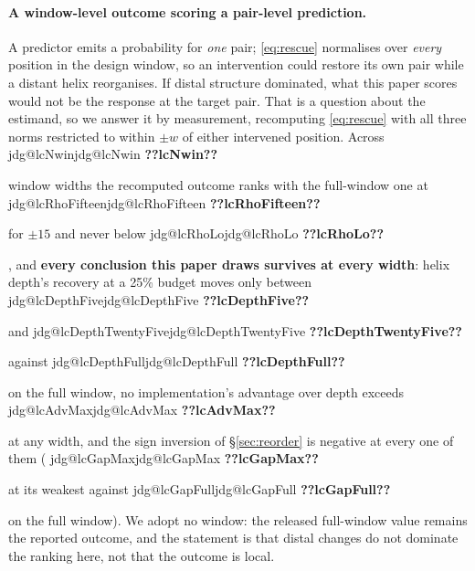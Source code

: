 \documentclass[11pt]{article}
\makeatletter
\newcommand{\jdg}[1]{%
  \ifcsname jdg@#1\endcsname\csname jdg@#1\endcsname
  \else\textbf{??#1??}\PackageError{nm}{undefined measured quantity #1}{}\fi}
\makeatother
\begin{document}
\paragraph{A window-level outcome scoring a pair-level prediction.} A predictor emits a probability
for \emph{one} pair; \eqref{eq:rescue} normalises over \emph{every} position in the design window,
so an intervention could restore its own pair while a distant helix reorganises. If distal
structure dominated, what this paper scores would not be the response at the target pair. That is a
question about the estimand, so we answer it by measurement, recomputing \eqref{eq:rescue} with all
three norms restricted to within $\pm w$ of either intervened position.
Across \jdg{lcNwin} window widths the recomputed outcome ranks with the full-window one at
\jdg{lcRhoFifteen} for $\pm15$ and never below \jdg{lcRhoLo}, and \textbf{every conclusion this
paper draws survives at every width}: helix depth's recovery at a 25\% budget moves only between
\jdg{lcDepthFive} and \jdg{lcDepthTwentyFive} against \jdg{lcDepthFull} on the full window, no
implementation's advantage over depth exceeds \jdg{lcAdvMax} at any width, and the sign inversion
of \S\ref{sec:reorder} is negative at every one of them (\jdg{lcGapMax} at its weakest against
\jdg{lcGapFull} on the full window). We adopt no window: the released full-window value remains
the reported outcome, and the statement is that distal changes do not dominate the ranking here,
not that the outcome is local.

\end{document}
